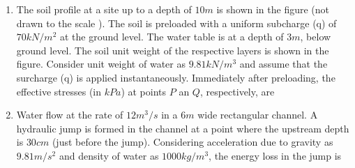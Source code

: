 \documentclass[journal,12pt,onecolumn]{IEEEtran}
\theoremstyle{remark}
\begin{document}
\begin{enumerate}
\begin{enumerate}
\end{enumerate}

\item The soil profile at a site up to a depth of $10m $ is shown in the figure (not drawn to the scale ). The soil is preloaded with a uniform subcharge (q) of $70 kN/m^{2}$ at the ground level. The water table is at a depth of $3m $, below ground level. The soil unit weight of the respective layers is shown in the figure. Consider unit weight of water as $9.81 k N/m^{3}$ and assume that the surcharge (q) is applied instantaneously. Immediately after preloading, the effective stresses (in $kPa$) at points $P $ an $Q$, respectively, are

	\begin{center}

	\end{center}

\begin{enumerate}
\end{enumerate}

\item Water flow at the rate of $12 m^{3}/s $ in a $6m $ wide rectangular channel. A hydraulic jump is formed in the channel at a point where the upstream depth is  $ 30cm $ (just before the jump). Considering acceleration due to gravity as $9.81 m/s^{2}$ and density of water as $1000kg/m^{3}$, the energy loss in the jump is 
\begin{enumerate}
\end{enumerate}


\end{enumerate}
\end{document}
